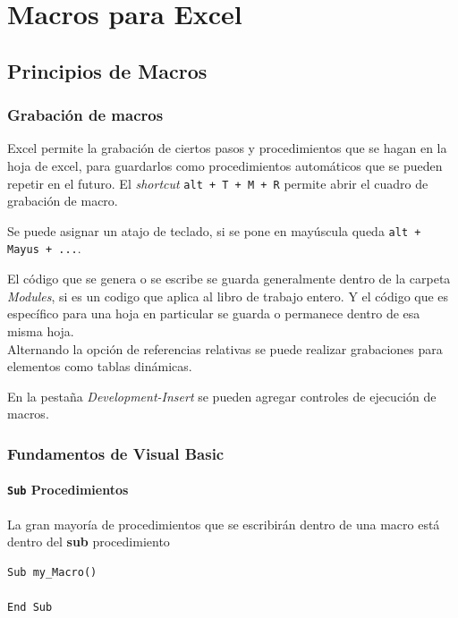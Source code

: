\chapter{Macros para Excel}

\section{Principios de Macros}


\subsection{Grabación de macros}

Excel permite la grabación de ciertos pasos y procedimientos que se hagan en la hoja de excel, para guardarlos como procedimientos automáticos que se pueden repetir en el futuro. El \textit{shortcut} \texttt{alt + T + M + R} permite abrir el cuadro de grabación de macro. 

Se puede asignar un atajo de teclado, si se pone en mayúscula queda \texttt{alt + Mayus + ...}. 

El código que se genera o se escribe se guarda generalmente dentro de la carpeta \textit{Modules}, si es un codigo que aplica al libro de trabajo entero. Y el código que es específico para una hoja en particular se guarda o permanece dentro de esa misma hoja. \\

Alternando la opción de referencias relativas se puede realizar grabaciones para elementos como tablas dinámicas.

En la pestaña \textit{Development-Insert} se pueden agregar controles de ejecución de macros.


\subsection{Fundamentos de Visual Basic}

\subsubsection{\texttt{Sub} Procedimientos}

La gran mayoría de procedimientos que se escribirán dentro de una macro está dentro del \textbf{sub} procedimiento

\begin{verbatim}
Sub my_Macro()

End Sub
\end{verbatim}

